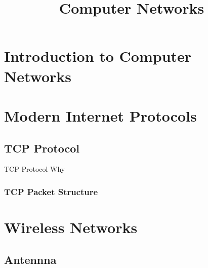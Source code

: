 \documentclass[a4paper,10pt]{article}
\title{Computer Networks}
\author{}
\date{}
\begin{document}
\maketitle
\section{Introduction to Computer Networks}
\section{Modern Internet Protocols}
\subsection{TCP Protocol}
\indent TCP Protocol
Why
\subsubsection{TCP Packet Structure}
\section{Wireless Networks}
\subsection{Antennna}
\end{document}
